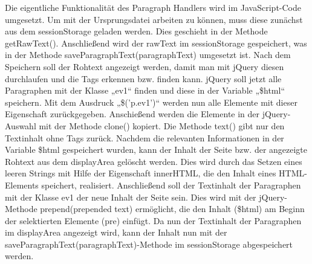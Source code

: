 {Die eigentliche Funktionalität des Paragraph Handlers wird im JavaScript-Code umgesetzt. Um mit der Ursprungsdatei arbeiten zu können, muss diese zunächst aus dem sessionStorage geladen werden. Dies geschieht in der Methode getRawText(). Anschließend wird der rawText im sessionStorage gespeichert, was in der Methode saveParagraphText(paragraphText) umgesetzt ist. Nach dem Speichern soll der Rohtext angezeigt werden, damit man mit jQuery diesen durchlaufen und die Tags erkennen bzw. finden kann. jQuery soll jetzt alle Paragraphen mit der Klasse „ev1“ finden und diese in der Variable „\$html“ speichern. Mit dem Ausdruck „\$('p.ev1')“ werden nun alle Elemente mit dieser Eigenschaft zurückgegeben. Anschießend werden die Elemente in der jQuery-Auswahl mit der Methode clone() kopiert. Die Methode text() gibt nur den Textinhalt ohne Tags zurück. Nachdem die relevanten Informationen in der Variable \$html gespeichert wurden, kann der Inhalt der Seite bzw. der angezeigte Rohtext aus dem displayArea gelöscht werden. Dies wird durch das Setzen eines leeren Strings mit Hilfe der Eigenschaft innerHTML, die den Inhalt eines HTML-Elements speichert, realisiert. Anschließend soll der Textinhalt der Paragraphen mit der Klasse ev1 der neue Inhalt der Seite sein. Dies wird mit der jQuery-Methode prepend(prepended text) ermöglicht, die den Inhalt (\$html) am Beginn der selektierten Elemente (pre) einfügt. Da nun der Textinhalt der Paragraphen im displayArea angezeigt wird, kann der Inhalt nun mit der saveParagraphText(paragraphText)-Methode im sessionStorage abgespeichert werden.

}
